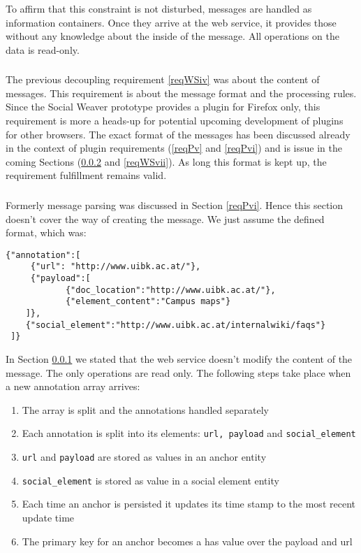 To affirm that this constraint is not disturbed, messages are handled as information containers. Once they arrive at the web service, it provides those without any knowledge about the inside of the message. All operations on the data is read-only. 

\subsubsection[Decoupling Web Service and Plugin]{\reqWSv}\label{reqWSv}

The previous decoupling requirement \ref{reqWSiv} was about the content of messages. This requirement is about the message format and the processing rules. Since the Social Weaver prototype provides a plugin for Firefox only, this requirement is more a heads-up for potential upcoming development of plugins for other browsers. 
The exact format of the messages has been discussed already in the context of plugin requirements (\ref{reqPv} and \ref{reqPvi}) and is issue in the coming Sections (\ref{reqWSvi} and \ref{reqWSvii}). As long this format is kept up, the requirement fulfillment remains valid. 

\subsubsection[Message Parsing]{\reqWSvi}\label{reqWSvi}

Formerly message parsing was discussed in Section \ref{reqPvi}. Hence this section doesn't cover the way of creating the message. We just assume the defined format, which was:
\begin{lstlisting}
{"annotation":[
	 {"url": "http://www.uibk.ac.at/"},
	 {"payload":[
 			{"doc_location":"http://www.uibk.ac.at/"},
 			{"element_content":"Campus maps"}
 	]},
 	{"social_element":"http://www.uibk.ac.at/internalwiki/faqs"}
 ]}
\end{lstlisting}

In Section \ref{reqWSv} we stated that the web service doesn't modify the content of the message. The only operations are read only. The following steps take place when a new annotation array arrives:

\begin{enumerate}
	\item The array is split and the annotations handled separately 
	\item Each annotation is split into its elements: \verb^url, payload^ and \verb^social_element^
	\item \verb^url^ and \verb^payload^ are stored as values in an anchor entity
	\item \verb^social_element^ is stored as value in a social element entity
	\item Each time an anchor is persisted it updates its time stamp to the most recent update time
	\item The primary key for an anchor becomes a has value over the payload and url
\end{enumerate}

